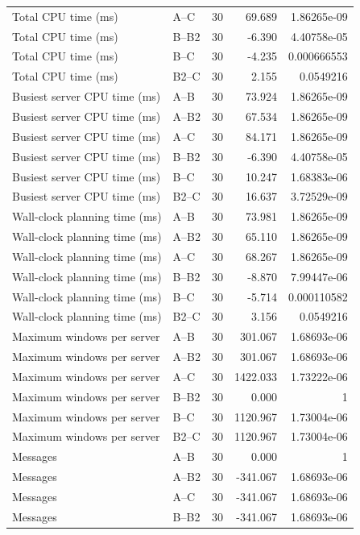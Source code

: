 \begin{table}[t]
\begin{tabular}{llrrr}
Total CPU time (ms) & A--C & 30 & 69.689 & 1.86265e-09 \\
Total CPU time (ms) & B--B2 & 30 & -6.390 & 4.40758e-05 \\
Total CPU time (ms) & B--C & 30 & -4.235 & 0.000666553 \\
Total CPU time (ms) & B2--C & 30 & 2.155 & 0.0549216 \\
Busiest server CPU time (ms) & A--B & 30 & 73.924 & 1.86265e-09 \\
Busiest server CPU time (ms) & A--B2 & 30 & 67.534 & 1.86265e-09 \\
Busiest server CPU time (ms) & A--C & 30 & 84.171 & 1.86265e-09 \\
Busiest server CPU time (ms) & B--B2 & 30 & -6.390 & 4.40758e-05 \\
Busiest server CPU time (ms) & B--C & 30 & 10.247 & 1.68383e-06 \\
Busiest server CPU time (ms) & B2--C & 30 & 16.637 & 3.72529e-09 \\
Wall-clock planning time (ms) & A--B & 30 & 73.981 & 1.86265e-09 \\
Wall-clock planning time (ms) & A--B2 & 30 & 65.110 & 1.86265e-09 \\
Wall-clock planning time (ms) & A--C & 30 & 68.267 & 1.86265e-09 \\
Wall-clock planning time (ms) & B--B2 & 30 & -8.870 & 7.99447e-06 \\
Wall-clock planning time (ms) & B--C & 30 & -5.714 & 0.000110582 \\
Wall-clock planning time (ms) & B2--C & 30 & 3.156 & 0.0549216 \\
Maximum windows per server & A--B & 30 & 301.067 & 1.68693e-06 \\
Maximum windows per server & A--B2 & 30 & 301.067 & 1.68693e-06 \\
Maximum windows per server & A--C & 30 & 1422.033 & 1.73222e-06 \\
Maximum windows per server & B--B2 & 30 & 0.000 & 1 \\
Maximum windows per server & B--C & 30 & 1120.967 & 1.73004e-06 \\
Maximum windows per server & B2--C & 30 & 1120.967 & 1.73004e-06 \\
Messages & A--B & 30 & 0.000 & 1 \\
Messages & A--B2 & 30 & -341.067 & 1.68693e-06 \\
Messages & A--C & 30 & -341.067 & 1.68693e-06 \\
Messages & B--B2 & 30 & -341.067 & 1.68693e-06 \\

\end{tabular}
\end{table}
